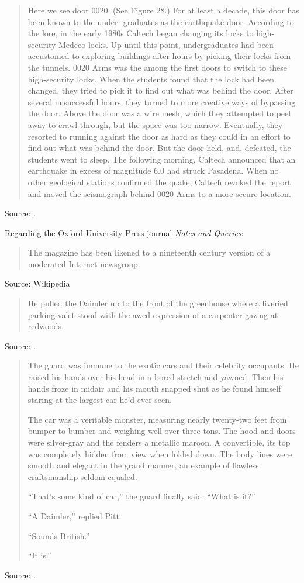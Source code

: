 \documentclass[a4paper]{article}
\begin{document}
\begin{quote}
	Here we see door 0020. (See
Figure 28.) For at least a decade, this door has been known to the under-
graduates as the earthquake door. According to the lore, in the early 1980s
Caltech began changing its locks to high-security Medeco locks. Up until this
point, undergraduates had been accustomed to exploring buildings after hours
by picking their locks from the tunnels. 0020 Arms was the among the first
doors to switch to these high-security locks. When the students found that the
lock had been changed, they tried to pick it to find out what was behind the
door. After several unsuccessful hours, they turned to more creative ways of
bypassing the door. Above the door was a wire mesh, which they attempted
to peel away to crawl through, but the space was too narrow. Eventually, they
resorted to running against the door as hard as they could in an effort to find
out what was behind the door. But the door held, and, defeated, the students
went to sleep. The following morning, Caltech announced that an earthquake in
excess of magnitude 6.0 had struck Pasadena. When no other geological stations
confirmed the quake, Caltech revoked the report and moved the seismograph
behind 0020 Arms to a more secure location.
\end{quote}
Source: \cite[pp. 22--23]{Antognini2010}.
\medskip

Regarding the Oxford University Press journal \emph{Notes and Queries}:
\begin{quote}
	The magazine has been likened to a nineteenth century version of a
	moderated Internet newsgroup.
\end{quote}
Source: Wikipedia
\medskip

\begin{quote}
	He pulled the Daimler up to the front of the greenhouse where a
	liveried parking valet stood with the awed expression of a
	carpenter gazing at redwoods.
\end{quote}
Source: \citet[p.~62]{Cussler1989}.
\medskip

\begin{quote}
	The guard was immune to the exotic cars and their celebrity occupants.
	He raised his hands over his head in a bored stretch and yawned.  Then
	his hands froze in midair and his mouth snapped shut as he found himself
	staring at the largest car he'd ever seen.

	The car was a veritable monster, measuring nearly twenty-two feet from
	bumper to bumber and weighing well over three tons.  The hood and doors
	were silver-gray and the fenders a metallic maroon.  A convertible, its
	top was completely hidden from view when folded down.  The body lines
	were smooth and elegant in the grand manner, an example of flawless
	craftsmanship seldom equaled.

	``That's some kind of car,'' the guard finally said.  ``What is it?''

	``A Daimler,'' replied Pitt.

	``Sounds British.''

	``It is.''
\end{quote}
Source: \citet[p.~61]{Cussler1989}.
\medskip
\end{document}
